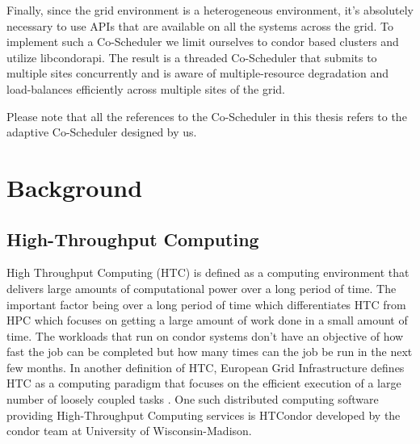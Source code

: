 \documentclass[ms,electronic,double]{nuthesis}
\begin{document}
Finally, since the grid environment is a heterogeneous environment, it's absolutely necessary
to use APIs that are available on all the systems across the grid. To implement such a Co-Scheduler
 we limit ourselves to condor based clusters and utilize libcondorapi. The result is a threaded Co-Scheduler 
that submits to multiple sites concurrently and is aware of multiple-resource degradation and
load-balances efficiently across multiple sites of the grid. 

Please note that all the references to the Co-Scheduler in this thesis refers to the adaptive Co-Scheduler designed 
by us.  

\chapter{Background}

\section{High-Throughput Computing} High Throughput Computing (HTC) is defined as 
a computing environment that delivers large amounts of computational
power over a long period of time. The important factor being over a long period of time which 
differentiates HTC from HPC which focuses on getting a large amount of work done in a small amount of time.
The workloads that run on condor systems don't have an objective of  how fast the job can be completed 
but how many times can the job be run in the next few months. In another definition of HTC, European Grid  
Infrastructure defines HTC as a computing paradigm that focuses on the efficient 
execution of a large number of loosely coupled tasks \cite{manual56}. One such 
distributed computing software providing High-Throughput Computing services is 
HTCondor developed by the condor team at University of Wisconsin-Madison.
\end{document}
